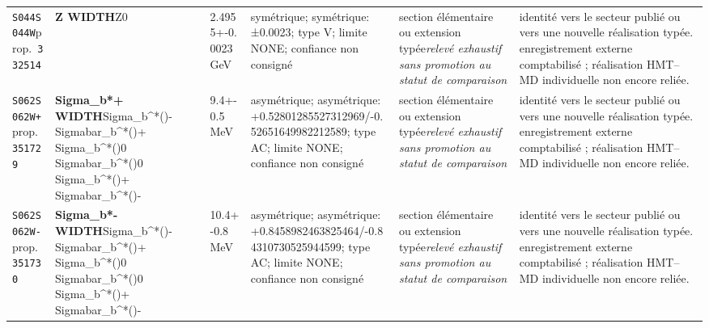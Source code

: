 \begin{landscape}
\begin{longtable}{L{1.85cm}L{4.45cm}L{2.35cm}L{4.05cm}L{3.35cm}L{7.15cm}}
\texttt{S044}\newline \texttt{S044W}\newline prop.\ \texttt{332514} & \textbf{Z WIDTH}\newline Z0 & 2.4955+-0.0023\,GeV & symétrique; symétrique: ±0.0023; type V; limite NONE; confiance non consigné & section élémentaire ou extension typée\newline \emph{relevé exhaustif sans promotion au statut de comparaison} & identité vers le secteur publié ou vers une nouvelle réalisation typée. enregistrement externe comptabilisé ; réalisation HMT--MD individuelle non encore reliée. \\
\texttt{S062}\newline \texttt{S062W+}\newline prop.\ \texttt{351729} & \textbf{Sigma\_\allowbreak{}b*+ WIDTH}\newline Sigma\_\allowbreak{}b\textasciicircum{}*()- \textbar{}\allowbreak{} Sigmabar\_\allowbreak{}b\textasciicircum{}*()+ \textbar{}\allowbreak{} Sigma\_\allowbreak{}b\textasciicircum{}*()0 \textbar{}\allowbreak{} Sigmabar\_\allowbreak{}b\textasciicircum{}*()0 \textbar{}\allowbreak{} Sigma\_\allowbreak{}b\textasciicircum{}*()+ \textbar{}\allowbreak{} Sigmabar\_\allowbreak{}b\textasciicircum{}*()- & 9.4+-0.5\,MeV & asymétrique; asymétrique: +0.52801285527312969/-0.52651649982212589; type AC; limite NONE; confiance non consigné & section élémentaire ou extension typée\newline \emph{relevé exhaustif sans promotion au statut de comparaison} & identité vers le secteur publié ou vers une nouvelle réalisation typée. enregistrement externe comptabilisé ; réalisation HMT--MD individuelle non encore reliée. \\
\texttt{S062}\newline \texttt{S062W-}\newline prop.\ \texttt{351730} & \textbf{Sigma\_\allowbreak{}b*- WIDTH}\newline Sigma\_\allowbreak{}b\textasciicircum{}*()- \textbar{}\allowbreak{} Sigmabar\_\allowbreak{}b\textasciicircum{}*()+ \textbar{}\allowbreak{} Sigma\_\allowbreak{}b\textasciicircum{}*()0 \textbar{}\allowbreak{} Sigmabar\_\allowbreak{}b\textasciicircum{}*()0 \textbar{}\allowbreak{} Sigma\_\allowbreak{}b\textasciicircum{}*()+ \textbar{}\allowbreak{} Sigmabar\_\allowbreak{}b\textasciicircum{}*()- & 10.4+-0.8\,MeV & asymétrique; asymétrique: +0.8458982463825464/-0.84310730525944599; type AC; limite NONE; confiance non consigné & section élémentaire ou extension typée\newline \emph{relevé exhaustif sans promotion au statut de comparaison} & identité vers le secteur publié ou vers une nouvelle réalisation typée. enregistrement externe comptabilisé ; réalisation HMT--MD individuelle non encore reliée. \\

\end{longtable}
\end{landscape}
